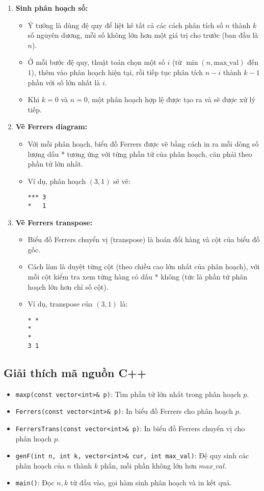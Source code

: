 \documentclass[12pt]{article}
\begin{document}
\begin{enumerate}
  \item \textbf{Sinh phân hoạch số:}
  \begin{itemize}
    \item Ý tưởng là dùng đệ quy để liệt kê tất cả các cách phân tích số $n$ thành $k$ số nguyên dương, mỗi số không lớn hơn một giá trị cho trước (ban đầu là $n$).
    \item Ở mỗi bước đệ quy, thuật toán chọn một số $i$ (từ $\min(n, \text{max\_val})$ đến $1$), thêm vào phân hoạch hiện tại, rồi tiếp tục phân tích $n-i$ thành $k-1$ phần với số lớn nhất là $i$.
    \item Khi $k=0$ và $n=0$, một phân hoạch hợp lệ được tạo ra và sẽ được xử lý tiếp.
  \end{itemize}
  \item \textbf{Vẽ Ferrers diagram:}
  \begin{itemize}
    \item Với mỗi phân hoạch, biểu đồ Ferrers được vẽ bằng cách in ra mỗi dòng số lượng dấu * tương ứng với từng phần tử của phân hoạch, căn phải theo phần tử lớn nhất.
    \item Ví dụ, phân hoạch $(3,1)$ sẽ vẽ:
    \begin{verbatim}
*** 3
*   1
    \end{verbatim}
  \end{itemize}
  \item \textbf{Vẽ Ferrers transpose:}
  \begin{itemize}
    \item Biểu đồ Ferrers chuyển vị (transpose) là hoán đổi hàng và cột của biểu đồ gốc.
    \item Cách làm là duyệt từng cột (theo chiều cao lớn nhất của phân hoạch), với mỗi cột kiểm tra xem từng hàng có dấu * không (tức là phần tử phân hoạch lớn hơn chỉ số cột).
    \item Ví dụ, transpose của $(3,1)$ là:
    \begin{verbatim}
* *
*  
*  
3 1
    \end{verbatim}
  \end{itemize}
\end{enumerate}

\subsection*{Giải thích mã nguồn C++}
\begin{itemize}
  \item \texttt{maxp(const vector<int>\& p)}: Tìm phần tử lớn nhất trong phân hoạch $p$.
  \item \texttt{Ferrers(const vector<int>\& p)}: In biểu đồ Ferrers cho phân hoạch $p$.
  \item \texttt{FerrersTrans(const vector<int>\& p)}: In biểu đồ Ferrers chuyển vị cho phân hoạch $p$.
  \item \texttt{genF(int n, int k, vector<int>\& cur, int max\_val)}: Đệ quy sinh các phân hoạch của $n$ thành $k$ phần, mỗi phần không lớn hơn $max\_val$.
  \item \texttt{main()}: Đọc $n, k$ từ đầu vào, gọi hàm sinh phân hoạch và in kết quả.
\end{itemize}
\end{document}
